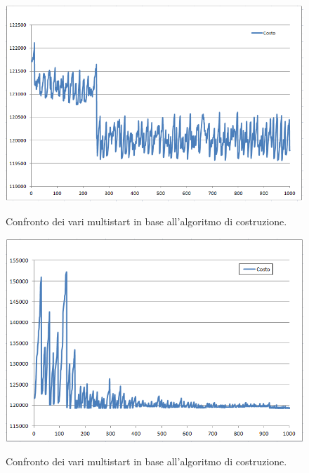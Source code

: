 \begin{figure}[h] 
\begin{center} 
  \includegraphics[scale=0.8]{Images/cost_tabu}\\ 
  \caption{\footnotesize{Confronto dei vari multistart in base all'algoritmo di costruzione.}}
  \label{perf_profile} 
\end{center} 
\end{figure}

\begin{figure}[h] 
\begin{center} 
  \includegraphics[scale=0.8]{Images/cost_sa}\\ 
  \caption{\footnotesize{Confronto dei vari multistart in base all'algoritmo di costruzione.}}
  \label{perf_profile} 
\end{center} 
\end{figure}

